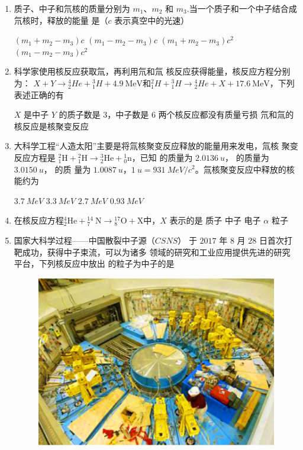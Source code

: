 \begin{enumerate}
\item 
{}
质子、中子和氘核的质量分别为 $ m_{1} $、$ m_{2} $ 和 $ m_{3} $.当一个质子和一个中子结合成氘核时，释放的能量
是（$ c $ 表示真空中的光速）  

\fourchoices
{$ ( m_{1} + m_{2} - m_{3} )c $}
{$ ( m_{1} - m_{2} - m_{3} )c $}
{$ ( m_{1} + m_{2} - m_{3} )c^{2} $}
{$ ( m_{1} - m_{2} - m_{3} )c^{2} $}




\item 
{}
科学家使用核反应获取氚，再利用氘和氚 核反应获得能量，核反应方程分别为：
$X+Y \rightarrow{ }_{2}^{4} H e+{ }_{1}^{3} H+4.9 \ \mathrm{MeV}$和${ }_{1}^{2} H+{ }_{1}^{3} H \rightarrow{ }_{2}^{4} H e+X+17.6 \  \mathrm{MeV}$，下列表述正确的有  


\fourchoices
{$ X $ 是中子}
{$ Y $ 的质子数是 $ 3 $，中子数是 $ 6 $}
{两个核反应都没有质量亏损}
{氘和氚的核反应是核聚变反应}



\item 
{}
大科学工程“人造太阳”主要是将氚核聚变反应释放的能量用来发电，氚核
聚变反应方程是 ${ }_{1}^{2} \mathrm{H}+{ }_{1}^{2} \mathrm{H} \rightarrow{ }_{2}^{3} \mathrm{He}+{ }_{0}^{1} \mathrm{n}$，已知  的质量为 $ 2.0136 \ u $，    的质量为 $ 3.0150 \ u $，  的质
量为 $ 1.0087 \ u $，$ 1 \ u=931 \ MeV/c^{2} $。氚核聚变反应中释放的核能约为  

\fourchoices
{$ 3.7 \ MeV $}
{$ 3.3 \ MeV $}
{$ 2.7 \ MeV $}
{$ 0.93 \ MeV $}




\item 
{}
在核反应方程${ }_{2}^{4} \mathrm{He}+{ }_{7}^{14} \mathrm{~N} \rightarrow{ }_{8}^{17} \mathrm{O}+\mathrm{X}$中，$ X $ 表示的是  
\fourchoices
{质子}
{中子}
{电子}
{$  \alpha  $ 粒子}


\item 
{}
国家大科学过程——中国散裂中子源（$ CSNS $）
于 $ 2017 $ 年 $ 8 $ 月 $ 28 $ 日首次打靶成功，获得中子束流，可以为诸多
领域的研究和工业应用提供先进的研究平台，下列核反应中放出
的粒子为中子的是  
\begin{figure}[h!]
	\centering
	\includegraphics[width=0.27\linewidth]{picture/screenshot070}
\end{figure}




\end{enumerate}
